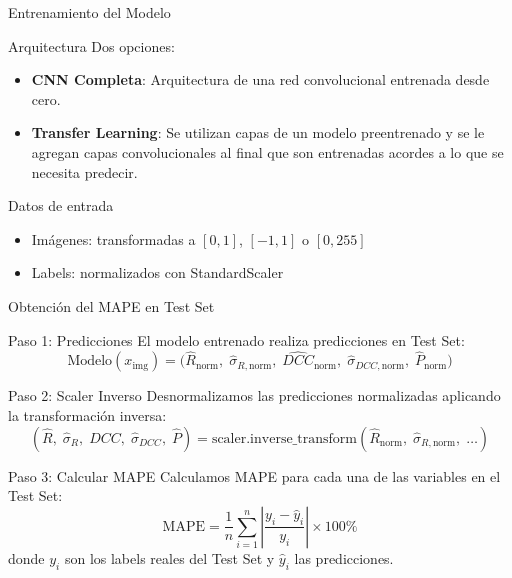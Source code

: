 \begin{frame}{Entrenamiento del Modelo}
    \begin{block}{Arquitectura}
        Dos opciones:
        \begin{itemize}
            \item \textbf{CNN Completa}: Arquitectura de una red convolucional entrenada desde cero.
            \item \textbf{Transfer Learning}: Se utilizan capas de un modelo preentrenado y se le agregan capas convolucionales al final que son entrenadas acordes a lo que se necesita predecir. 
        \end{itemize}
    \end{block}
    
    \begin{block}{Datos de entrada}
        \begin{itemize}
            \item Imágenes: transformadas a $[0,1]$, $[-1,1]$ o $[0,255]$
            \item Labels: normalizados con StandardScaler
        \end{itemize}
    \end{block}
    
\end{frame}

\begin{frame}{Obtención del MAPE en Test Set}
    \begin{block}{Paso 1: Predicciones}
        El modelo entrenado realiza predicciones en Test Set:
        $$ \text{Modelo}(x_{\text{img}}) = \bigl(\hat{R}_{\text{norm}},\; \hat{\sigma}_{R,\text{norm}},\; \hat{DCC}_{\text{norm}},\; \hat{\sigma}_{DCC,\text{norm}},\; \hat{P}_{\text{norm}}\bigr) $$
    \end{block}
    
    \begin{block}{Paso 2: Scaler Inverso}
        Desnormalizamos las predicciones normalizadas aplicando la transformación inversa:
        $$(\hat{R},\; \hat{\sigma}_R,\; \hat{DCC},\; \hat{\sigma}_{DCC},\; \hat{P}) = \text{scaler.inverse\_transform}(\hat{R}_{\text{norm}},\; \hat{\sigma}_{R,\text{norm}},\; \ldots)$$
    \end{block}
    
    \begin{exampleblock}{Paso 3: Calcular MAPE}
        Calculamos MAPE para cada una de las variables en el Test Set:
        $$\text{MAPE} = \frac{1}{n}\sum_{i=1}^{n}\left|\frac{y_i - \hat{y}_i}{y_i}\right| \times 100\text{\%}$$
        donde $y_i$ son los labels reales del Test Set y $\hat{y}_i$ las predicciones.
    \end{exampleblock}
\end{frame}
